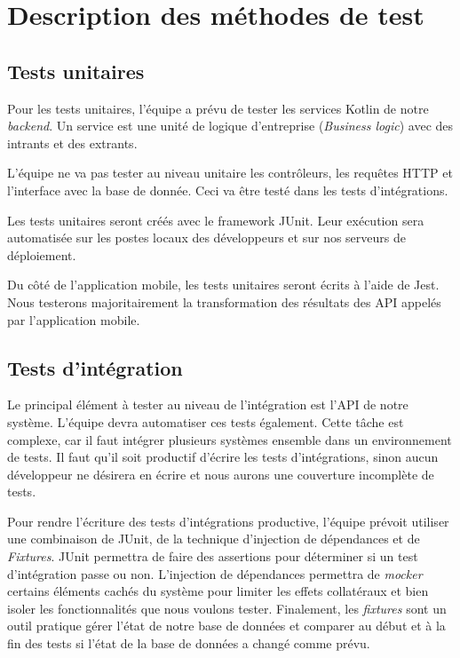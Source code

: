 \section{Description des méthodes de test}
	\subsection{Tests unitaires}
	Pour les tests unitaires, l’équipe a prévu de tester les services Kotlin de notre \emph{backend}. Un service est une unité de logique d’entreprise (\emph{Business logic}) avec des intrants et des extrants. 

	L’équipe ne va pas tester au niveau unitaire les contrôleurs, les requêtes HTTP et l'interface avec la base de donnée. Ceci va être testé dans les tests d’intégrations.

	Les tests unitaires seront créés avec le framework JUnit. Leur exécution sera automatisée sur les postes locaux des développeurs et sur nos serveurs de déploiement. 

	Du côté de l’application mobile, les tests unitaires seront écrits à l’aide de Jest. Nous testerons majoritairement la transformation des résultats des API appelés par l’application mobile. 

	\subsection{Tests d'intégration}
	Le principal élément à tester au niveau de l’intégration est l’API de notre système. L’équipe devra automatiser ces tests également. Cette tâche est complexe, car il faut intégrer plusieurs systèmes ensemble dans un environnement de tests. Il faut qu’il soit productif d’écrire les tests d’intégrations, sinon aucun développeur ne désirera en écrire et nous aurons une couverture incomplète de tests.

	Pour rendre l’écriture des tests d’intégrations productive, l’équipe prévoit utiliser une combinaison de JUnit, de la technique d’injection de dépendances et de \emph{Fixtures}. JUnit permettra de faire des assertions pour déterminer si un test d’intégration passe ou non. L’injection de dépendances permettra de \emph{mocker} certains éléments cachés du système pour limiter les effets collatéraux et bien isoler les fonctionnalités que nous voulons tester. Finalement, les \emph{fixtures} sont un outil pratique gérer l’état de notre base de données et comparer au début et à la fin des tests si l’état de la base de données a changé comme prévu.

